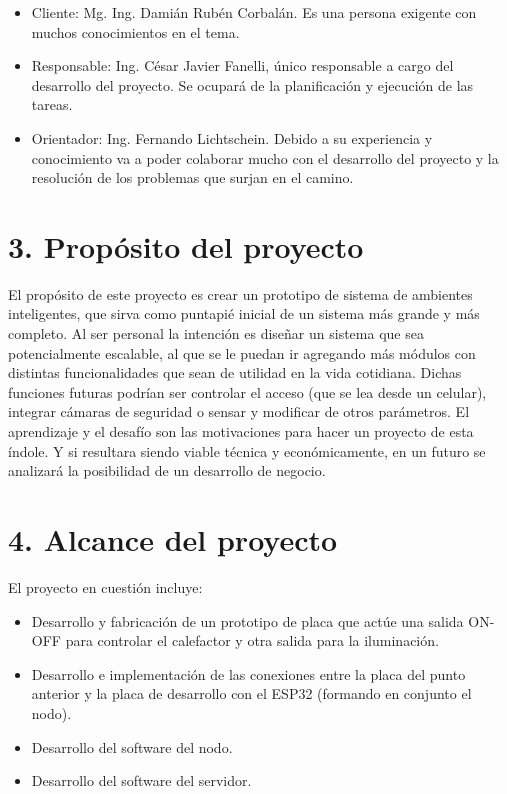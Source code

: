 \documentclass[
11pt, %
]{charter}
\begin{document}
\begin{itemize}
	\item Cliente: Mg. Ing. Damián Rubén Corbalán. Es una persona exigente con muchos conocimientos en el tema.
	\item Responsable: Ing. César Javier Fanelli, único responsable a cargo del desarrollo del proyecto. Se ocupará de la planificación y ejecución de las tareas.
	\item Orientador: Ing. Fernando Lichtschein. Debido a su experiencia y conocimiento va a poder colaborar mucho con el desarrollo del proyecto y la resolución de los problemas que surjan en el camino.
\end{itemize}

\section{3. Propósito del proyecto}
\label{sec:proposito}

El propósito de este proyecto es crear un prototipo de sistema de ambientes inteligentes, que sirva como puntapié inicial de un sistema más grande y más completo. Al ser personal la intención es diseñar un sistema que sea potencialmente escalable, al que se le puedan ir agregando más módulos con distintas funcionalidades que sean de utilidad en la vida cotidiana. Dichas funciones futuras podrían ser controlar el acceso (que se lea desde un celular), integrar cámaras de seguridad o sensar y modificar de otros parámetros. El aprendizaje y el desafío son las motivaciones para hacer un proyecto de esta índole. Y si resultara siendo viable técnica y económicamente, en un futuro se analizará la posibilidad de un desarrollo de negocio.

\section{4. Alcance del proyecto}
\label{sec:alcance}

El proyecto en cuestión incluye:
\begin{itemize}
	\item Desarrollo y fabricación de un prototipo de placa que actúe una salida ON-OFF para controlar el calefactor y otra salida para la iluminación.
	\item Desarrollo e implementación de las conexiones entre la placa del punto anterior y la placa de desarrollo con el ESP32 (formando en conjunto el nodo).
	\item Desarrollo del software del nodo.
	\item Desarrollo del software del servidor.
\end{itemize}
\end{document}
